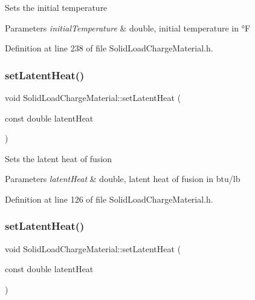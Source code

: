 Sets the initial temperature 
\begin{DoxyParams}{Parameters}
{\em initial\+Temperature} & double, initial temperature in °F \\
\hline
\end{DoxyParams}


Definition at line 238 of file Solid\+Load\+Charge\+Material.\+h.

\mbox{\label{class_solid_load_charge_material_ac7361119ab7cc352dfbdc6fcb9175981}} 
\subsubsection{\texorpdfstring{set\+Latent\+Heat()}{setLatentHeat()}\hspace{0.1cm}{\footnotesize\ttfamily [1/3]}}
{\footnotesize\ttfamily void Solid\+Load\+Charge\+Material\+::set\+Latent\+Heat (\begin{DoxyParamCaption}\item[{const double}]{latent\+Heat }\end{DoxyParamCaption})\hspace{0.3cm}{\ttfamily [inline]}}

Sets the latent heat of fusion 
\begin{DoxyParams}{Parameters}
{\em latent\+Heat} & double, latent heat of fusion in btu/lb \\
\hline
\end{DoxyParams}


Definition at line 126 of file Solid\+Load\+Charge\+Material.\+h.

\mbox{\label{class_solid_load_charge_material_ac7361119ab7cc352dfbdc6fcb9175981}} 
\subsubsection{\texorpdfstring{set\+Latent\+Heat()}{setLatentHeat()}\hspace{0.1cm}{\footnotesize\ttfamily [2/3]}}
{\footnotesize\ttfamily void Solid\+Load\+Charge\+Material\+::set\+Latent\+Heat (\begin{DoxyParamCaption}\item[{const double}]{latent\+Heat }\end{DoxyParamCaption})\hspace{0.3cm}{\ttfamily [inline]}}

